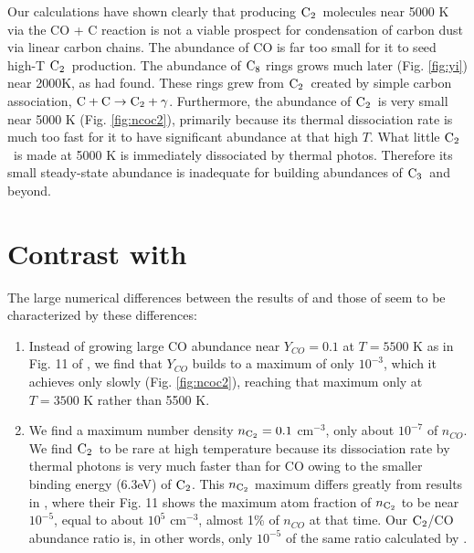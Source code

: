 \documentclass[manuscript]{aastex}
\newcommand{\ctwo}{{\rm C}_2}
\newcommand{\cthree}{{\rm C}_3}
\newcommand{\ceight}{{\rm C}_8}
\newcommand{\twoctoctwo}{${\rm C} + {\rm C} \to \ctwo + \gamma$}
\begin{document}
\begin{CJK*}{UTF8}{gbsn}
Our calculations have shown clearly that producing $\ctwo$\ molecules near
5000 K via the CO + C reaction \citep{2009ApJ...703..642C} is not a viable
prospect for condensation of carbon dust via linear carbon chains.
The abundance of CO is far too small for it to seed high-T $\ctwo$\ production.
The abundance of $\ceight$
rings grows much later (Fig. \ref{fig:yi}) near 2000K, as
\citet{1999Sci...283.1290C,2001ApJ...562..480C} had found.
These rings grew from $\ctwo$\ created by simple carbon association,
\twoctoctwo.
Furthermore, the abundance of $\ctwo$\ is very small near 5000 K
(Fig. \ref{fig:ncoc2}),
primarily because its thermal dissociation rate is much too fast for
it to have significant abundance at that high $T$.
What little $\ctwo$\ is made at 5000 K is immediately dissociated by
thermal photos. Therefore its small steady-state abundance is inadequate
for building abundances of $\cthree$\ and beyond. 

\section{Contrast with \citet{2009ApJ...703..642C,2010ApJ...713....1C}}

The large numerical differences between the results of
\citet{1999Sci...283.1290C,2001ApJ...562..480C}
and those of \citet{2009ApJ...703..642C,2010ApJ...713....1C}
seem to be characterized by these differences:
\begin{enumerate}

\item Instead of growing large CO abundance near $Y_{CO}=0.1$ at $T=5500$ K
as in Fig. 11 of \citet{2009ApJ...703..642C}, we find that $Y_{CO}$
builds to a maximum of only $10^{-3}$, which it achieves only slowly
(Fig. \ref{fig:ncoc2}), reaching that maximum only at $T=3500$ K rather
than 5500 K.

\item We find a maximum number density $n_{\ctwo} = 0.1$ cm$^{-3}$,
only about $10^{-7}$ of
$n_{CO}$. We find $\ctwo$\ to be rare at high temperature because its
dissociation rate by thermal photons is very much faster than for CO
owing to the smaller binding energy (6.3eV) of $\ctwo$. This $n_{\ctwo}$
maximum differs greatly from results in \citet{2009ApJ...703..642C},
where their Fig. 11 shows the maximum atom fraction of $n_{\ctwo}$ to be
near $10^{-5}$, equal to about $10^5$ cm$^{-3}$, almost 1\% of
$n_{CO}$ at that time. Our $\ctwo$/CO abundance ratio is,
in other words, only $10^{-5}$ of the same ratio calculated by
\citet{2009ApJ...703..642C}.


\end{enumerate}
\end{CJK*}
\end{document}
